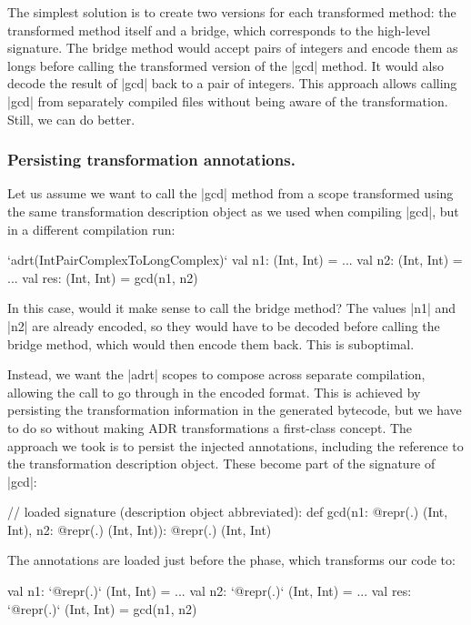 The simplest solution is to create two versions for each transformed method: the transformed method itself and a bridge, which corresponds to the high-level signature. The bridge method would accept pairs of integers and encode them as longs before calling the transformed version of the |gcd| method. It would also decode the result of |gcd| back to a pair of integers. This approach allows calling |gcd| from separately compiled files without being aware of the transformation. Still, we can do better.


\subsubsection*{Persisting transformation annotations.} Let us assume we want to call the |gcd| method from a scope transformed using the same transformation description object as we used when compiling |gcd|, but in a different compilation run:

\begin{lstlisting-nobreak}
`adrt(IntPairComplexToLongComplex)` {
  val n1: (Int, Int) = ...
  val n2: (Int, Int) = ...
  val res: (Int, Int) = gcd(n1, n2)
}
\end{lstlisting-nobreak}

In this case, would it make sense to call the bridge method? The values |n1| and |n2| are already encoded, so they would have to be decoded before calling the bridge method, which would then encode them back. This is suboptimal.

Instead, we want the |adrt| scopes to compose across separate compilation, allowing the call to go through in the encoded format.  This is achieved by persisting the transformation information in the generated bytecode, but we have to do so without making ADR transformations a first-class concept. The approach we took is to persist the injected annotations, including the reference to the transformation description object. These become part of the signature of |gcd|:

\begin{lstlisting-nobreak}
// loaded signature (description object abbreviated):
def gcd(n1: @repr(.) (Int, Int), n2: @repr(.) (Int, Int)): @repr(.) (Int, Int)
\end{lstlisting-nobreak}

The annotations are loaded just before the \inject{} phase, which transforms our code to:

\begin{lstlisting-nobreak}
val n1: `@repr(.)` (Int, Int) = ...
val n2: `@repr(.)` (Int, Int) = ...
val res: `@repr(.)` (Int, Int) = gcd(n1, n2)
\end{lstlisting-nobreak}

